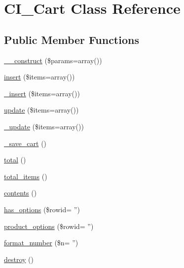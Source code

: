 \hypertarget{class_c_i___cart}{\section{C\-I\-\_\-\-Cart Class Reference}
\label{class_c_i___cart}
}
\subsection*{Public Member Functions}
\begin{DoxyCompactItemize}
\item 
\hyperlink{class_c_i___cart_a568ecdb0d73d2a870f33189739922a50}{\-\_\-\-\_\-construct} (\$params=array())
\item 
\hyperlink{class_c_i___cart_a07488e002c513013079157a9fe61a8e3}{insert} (\$items=array())
\item 
\hyperlink{class_c_i___cart_a55d27979573b7d46bdf774f247c15b07}{\-\_\-insert} (\$items=array())
\item 
\hyperlink{class_c_i___cart_adddf5d1a4f704b647f28b0322f8b64f2}{update} (\$items=array())
\item 
\hyperlink{class_c_i___cart_ac7b19afff2357d4b9e926ee2df1f3e65}{\-\_\-update} (\$items=array())
\item 
\hyperlink{class_c_i___cart_abaa559f3e9e7f8ad933f19165fb61083}{\-\_\-save\-\_\-cart} ()
\item 
\hyperlink{class_c_i___cart_a9efa17b570797933c7c5b0c68f743a55}{total} ()
\item 
\hyperlink{class_c_i___cart_a785be13903ee65b8936d523b2728e53a}{total\-\_\-items} ()
\item 
\hyperlink{class_c_i___cart_a3c3eeaf9ed289e55cd34926feb82eabf}{contents} ()
\item 
\hyperlink{class_c_i___cart_aabcb32751bff6bec65aa62fc152d5dde}{has\-\_\-options} (\$rowid= '')
\item 
\hyperlink{class_c_i___cart_ac4ca22391c63376c2b134e5138712ace}{product\-\_\-options} (\$rowid= '')
\item 
\hyperlink{class_c_i___cart_a0ee4758d55d11ab91f5b7ac04b1eedc3}{format\-\_\-number} (\$n= '')
\item 
\hyperlink{class_c_i___cart_aa118461de946085fe42989193337044a}{destroy} ()
\end{DoxyCompactItemize}
